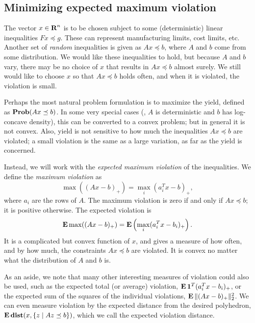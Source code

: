 \documentclass[12pt]{article}
\begin{document}
%
%
%
%

\subsection{Minimizing expected maximum violation}

The vector $x \in {\mbox{\bf R}}^n$ is to be chosen subject to some
(deterministic) linear inequalities $Fx \preceq g$.
These can represent manufacturing limits, cost limits, etc.
Another set of \emph{random} inequalities is given as $Ax \preceq b$,
where $A$ and $b$ come from some distribution.
We would like these inequalities to hold, but because $A$ and $b$
vary, there may be no choice of $x$ that results in
$Ax \preceq b$ almost surely.
We still would like to choose $x$ so that $Ax \preceq b$ holds often,
and when it is violated, the violation is small.

Perhaps the most natural problem formulation is to maximize the yield,
defined as $\mathop{\bf Prob} (Ax \preceq b)$.  In some very special cases
(\eg, $A$ is deterministic and $b$ has log-concave density),
this can be converted to a convex problem; but in general it is
not convex.
Also, yield is not sensitive to how much the inequalities
$Ax \preceq b$ are violated; a small violation is the same as a large
variation, as far as the yield is concerned.

Instead, we will work with the \emph{expected maximum violation}
of the inequalities.
We define the \emph{maximum violation} as
\[
\max((Ax-b)_+)= \max_i (a_i^Tx-b)_+,
\]
where $a_i$ are the rows of $A$.
The maximum violation is zero if and only if
$Ax \preceq b$; it is positive otherwise.
The expected violation is
\[
\mathop{\bf E{}} \max((Ax-b)_+)=
\mathop{\bf E{}} \left(\max_i (a_i^Tx-b_i)_+ \right).
\]
It is a complicated
but convex function of $x$, and gives a measure of how often, and by
how much, the constraints $Ax \preceq b$ are violated.
It is convex no matter what the distribution of $A$ and $b$ is.

As an aside, we note that
many other interesting measures of violation could also be used,
such as the expected total (or average) violation,
$\mathop{\bf E{}} \mathbf 1^T(a_i^Tx-b_i)_+$,
or the expected sum of the squares of the individual violations,
$\mathop{\bf E{}} \| (Ax-b)_+\|_2^2$.
We can even measure violation by the expected distance from the desired
polyhedron, $\mathop{\bf E{}} \mathop{\bf dist{}} (x, \{z \;|\; Az \preceq b\})$,
which we call the expected violation distance.
\end{document}
